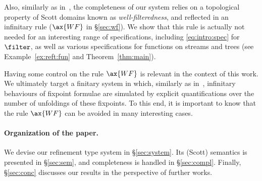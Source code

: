 Also, similarly as in~\cite{bk03ic}, the completeness of
our system relies on a topological property of Scott domains
known as \emph{well-filteredness},
and reflected in an infinitary rule ($\ax{WF}$ in \S\ref{sec:wf}).
We show that this rule is actually not needed for an
interesting range of specifications,
including \eqref{eq:intro:spec} for $\filter$,
as well as
various specifications for functions on streams and trees
(see Example~\ref{ex:reft:fun} and Theorem~\ref{thm:main}).

Having some control on the rule $\ax{WF}$
is relevant in the context of this work.
We ultimately target a finitary system in which,
similarly as in~\cite{jr21esop},
infinitary behaviours of fixpoint formulae are simulated
by explicit quantifications over the number of unfoldings
of these fixpoints.
To this end, it is important to know that the rule $\ax{WF}$
can be avoided in many interesting cases.


\paragraph{Organization of the paper.}
We devise our refinement type system in \S\ref{sec:system}.
Its (Scott) semantics is presented in \S\ref{sec:sem},
and completeness is handled in \S\ref{sec:compl}.
Finally, \S\ref{sec:conc} discusses our results in the perspective of further works.







